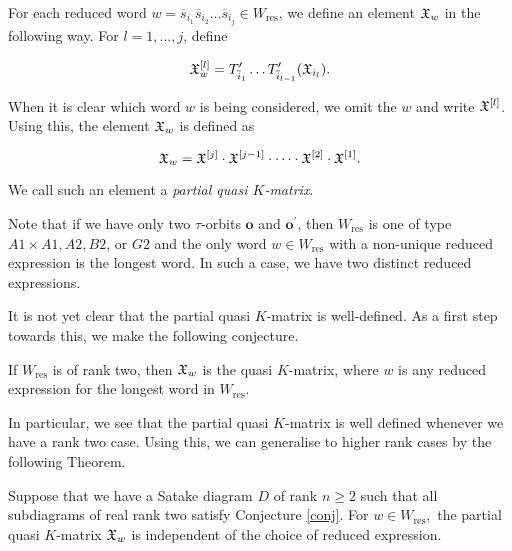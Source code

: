 \documentclass[a4 paper, 10pt]{article}
\begin{document}
\begin{definition} 
For each reduced word $w = \overline{s}_{i_1}\overline{s}_{i_2} \dots \overline{s}_{i_j} \in W_{\text{res}}$, we define an element $\mathfrak{X}_w$ in the following way. 
For $l = 1, \dots, j$, define

\begin{equation} \label{eq:Qkmcomp}
	\mathfrak{X}_w^{[l]} = T_{\overline{i}_1}^{\prime} \dots T_{\overline{i}_{l-1}}^{\prime}( \mathfrak{X}_{i_l} ).
\end{equation}

\vspace{5pt}

\noindent When it is clear which word $w$ is being considered, we omit the $w$ and write $\mathfrak{X}^{[l]}$. Using this, the element $\mathfrak{X}_w$ is defined as
		
\begin{equation} \label{eq:Qkmw}
	\mathfrak{X}_w = \mathfrak{X}^{[j]} \cdot \mathfrak{X}^{[j-1]} \cdot \cdots \cdot \mathfrak{X}^{[2]} \cdot \mathfrak{X}^{[1]}.
\end{equation}

\vspace{5pt} 

\noindent We call such an element a \emph{partial quasi $K$-matrix}. 
\end{definition}

Note that if we have only two $\tau$-orbits $\textbf{o}$ and $\textbf{o}^{\prime}$, then $W_{\text{res}}$ is one of type $A1 \times A1, A2, B2$, or $G2$ and the only word $w \in W_{\text{res}}$ with a non-unique reduced expression is the longest word. In such a case, we have two distinct reduced expressions. 

It is not yet clear that the partial quasi $K$-matrix is well-defined. As a first step towards this, we make the following conjecture.

\begin{conjecture} \label{conj}
If $W_{\text{res}}$ is of rank two, then $\mathfrak{X}_{w}$ is the quasi $K$-matrix, where $w$ is any reduced expression for the longest word in $W_{\text{res}}$.   
\end{conjecture}

\noindent In particular, we see that the partial quasi $K$-matrix is well defined whenever we have a rank two case. Using this, we can generalise to higher rank cases by the following Theorem. 

\begin{theorem} \label{Qkmindep}
Suppose that we have a Satake diagram $D$ of rank $n \geq 2$ such that all subdiagrams of real rank two satisfy Conjecture \ref{conj}. For $w \in W_{\text{res}},$ the partial quasi $K$-matrix $\mathfrak{X}_w$ is independent of the choice of reduced expression.
\end{theorem}
\end{document}

